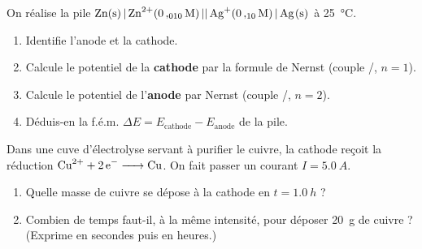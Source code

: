\documentclass[11pt,a4paper]{article}
\newcommand{\fem}{\ensuremath{\Delta E}}
\newcounter{exo}
\begin{document}
\begin{exo}
On réalise la pile $\ce{Zn(s) | Zn^{2+}(0{,}010\,M) || Ag+(0{,}10\,M) | Ag(s)}$ à \SI{25}{\celsius}.
\begin{enumerate}[label=\textbf{\alph*)},leftmargin=2.2em,topsep=2pt,itemsep=2pt]
  \item Identifie l'anode et la cathode.
  \item Calcule le potentiel de la \textbf{cathode} par la formule de Nernst (couple /, $n=1$).
  \item Calcule le potentiel de l'\textbf{anode} par Nernst (couple /, $n=2$).
  \item Déduis-en la f.é.m. $\fem = E_{\text{cathode}} - E_{\text{anode}}$ de la pile.
\end{enumerate}
\end{exo}

\begin{exo}
Dans une cuve d'électrolyse servant à purifier le cuivre, la cathode reçoit la réduction
$\ce{Cu^{2+} + 2 e^- -> Cu}$. On fait passer un courant $I=\SI{5.0}{A}$.
\begin{enumerate}[label=\textbf{\alph*)},leftmargin=2.2em,topsep=2pt,itemsep=2pt]
  \item Quelle masse de cuivre se dépose à la cathode en $t=\SI{1.0}{h}$ ?
  \item Combien de temps faut-il, à la même intensité, pour déposer \SI{20}{g} de cuivre ?
        (Exprime en secondes puis en heures.)
\end{enumerate}
\end{exo}
\end{document}
